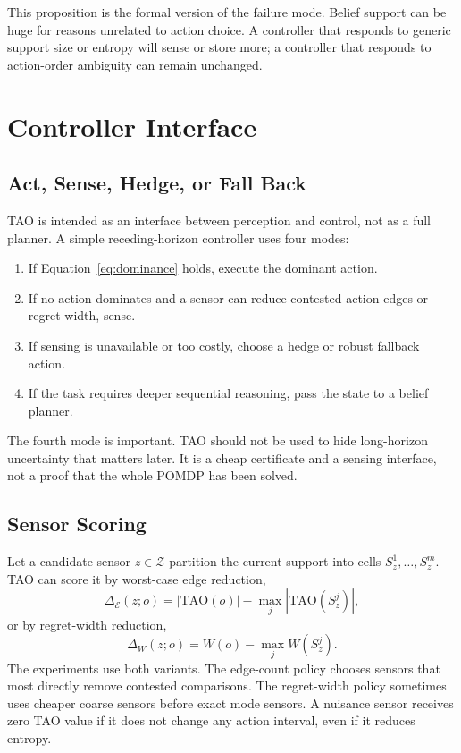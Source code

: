 \documentclass{article}
\newcommand{\edges}{\mathcal{E}}
\newcommand{\tao}{\mathrm{TAO}}
\newcommand{\sensors}{\mathcal{Z}}
\begin{document}
This proposition is the formal version of the failure mode. Belief support can be huge for reasons unrelated to action choice. A controller that responds to generic support size or entropy will sense or store more; a controller that responds to action-order ambiguity can remain unchanged.

\section{Controller Interface}

\subsection{Act, Sense, Hedge, or Fall Back}

TAO is intended as an interface between perception and control, not as a full planner. A simple receding-horizon controller uses four modes:
\begin{enumerate}
  \item If Equation~\ref{eq:dominance} holds, execute the dominant action.
  \item If no action dominates and a sensor can reduce contested action edges or regret width, sense.
  \item If sensing is unavailable or too costly, choose a hedge or robust fallback action.
  \item If the task requires deeper sequential reasoning, pass the state to a belief planner.
\end{enumerate}
The fourth mode is important. TAO should not be used to hide long-horizon uncertainty that matters later. It is a cheap certificate and a sensing interface, not a proof that the whole POMDP has been solved.

\subsection{Sensor Scoring}

Let a candidate sensor $z\in\sensors$ partition the current support into cells $S_z^1,\ldots,S_z^m$. TAO can score it by worst-case edge reduction,
\begin{equation}
  \Delta_{\edges}(z;o)
  =
  |\tao(o)| - \max_j |\tao(S_z^j)|,
\end{equation}
or by regret-width reduction,
\begin{equation}
  \Delta_W(z;o)
  =
  W(o) - \max_j W(S_z^j).
\end{equation}
The experiments use both variants. The edge-count policy chooses sensors that most directly remove contested comparisons. The regret-width policy sometimes uses cheaper coarse sensors before exact mode sensors. A nuisance sensor receives zero TAO value if it does not change any action interval, even if it reduces entropy.
\end{document}

